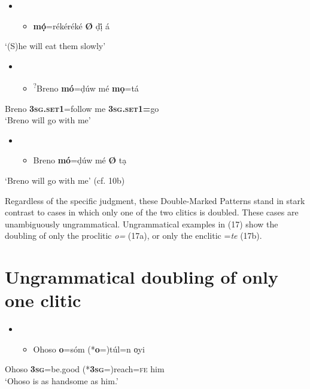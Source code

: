 \begin{itemize}
\item \setcounter{itemize}{0}
\begin{itemize}
\item \gll \textbf{mọ́}=rékéréké \textbf{Ø} ḍị́ á\\
\end{itemize}
\end{itemize}
\glt ‘(S)he will eat them slowly’
\z

\begin{itemize}
\item \setcounter{itemize}{0}
\begin{itemize}
\item \gll \textsuperscript{?}Breno  \textbf{mó}=ḍúw    mé   \textbf{mọ}=tá    \\
\end{itemize}
\end{itemize}
     Breno     \textbf{\textsc{3sg.set1}}=follow  me  \textbf{\textsc{3sg.set1=}}go\\
\glt ‘Breno will go with me’
\z

\begin{itemize}
\item \setcounter{itemize}{0}
\begin{itemize}
\item \gll Breno \textbf{mó}=ḍúw mé \textbf{Ø} tạ\\
\end{itemize}
\end{itemize}
\glt ‘Breno will go with me’ (cf. 10b)
\z

Regardless of the specific judgment, these Double-Marked Patterns stand in stark contrast to cases in which only one of the two clitics is doubled. These cases are unambiguously ungrammatical. Ungrammatical examples in (17) show the doubling of only the proclitic \textit{o=} (17a), or only the enclitic =\textit{te }(17b). 

\chapter[Ungrammatical doubling of only one clitic]{Ungrammatical doubling of only one clitic}
\label{bkm:Ref448217188}\begin{itemize}
\item \setcounter{itemize}{0}
\begin{itemize}
\item \gll Ohoso \textbf{  o}=sóm       (*\textbf{o}=)túl=n       o̩yi\\
\end{itemize}
\end{itemize}
       Ohoso  \textbf{\textsc{3sg}}=be.good   (*\textbf{\textsc{3sg}}=)reach=\textsc{fe  }   him\\
\glt ‘Ohoso is as handsome as him.’
\z

